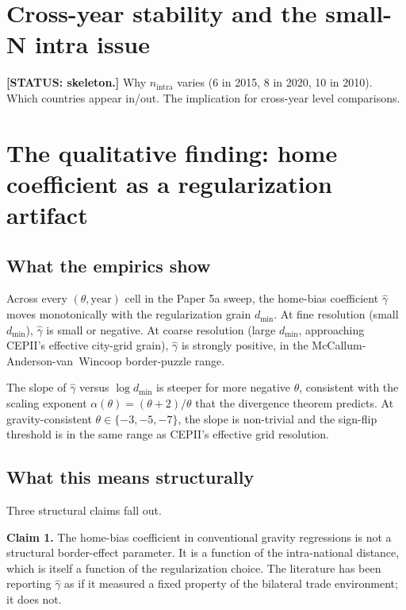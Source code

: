 \documentclass[11pt,letterpaper,oneside]{book}
\theoremstyle{definition}
\theoremstyle{remark}
\begin{document}
\chapter{Cross-year stability and the small-N intra issue}

\textbf{[STATUS: skeleton.]} Why $n_{\text{intra}}$ varies (6 in 2015, 8
in 2020, 10 in 2010). Which countries appear in/out. The implication for
cross-year level comparisons.

\chapter{The qualitative finding: home coefficient as a regularization artifact}
\label{ch:qualitative}

\section{What the empirics show}

Across every $(\theta, \text{year})$ cell in the Paper 5a sweep, the
home-bias coefficient $\hat{\gamma}$ moves monotonically with the
regularization grain $d_{\min}$. At fine resolution (small $d_{\min}$),
$\hat{\gamma}$ is small or negative. At coarse resolution
(large $d_{\min}$, approaching CEPII's effective city-grid grain),
$\hat{\gamma}$ is strongly positive, in the McCallum-Anderson-van~Wincoop
border-puzzle range.

The slope of $\hat{\gamma}$ versus $\log d_{\min}$ is steeper for more
negative $\theta$, consistent with the scaling exponent
$\alpha(\theta) = (\theta + 2)/\theta$ that the divergence theorem
predicts. At gravity-consistent $\theta \in \{-3, -5, -7\}$, the
slope is non-trivial and the sign-flip threshold is in the same
range as CEPII's effective grid resolution.

\section{What this means structurally}

Three structural claims fall out.

\textbf{Claim 1.} The home-bias coefficient in conventional gravity
regressions is not a structural border-effect parameter. It is a
function of the intra-national distance, which is itself a function
of the regularization choice. The literature has been reporting
$\hat{\gamma}$ as if it measured a fixed property of the bilateral
trade environment; it does not.
\end{document}
